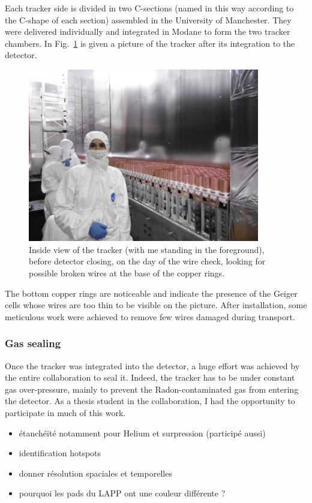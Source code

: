 Each tracker side is divided in two C-sections (named in this way according to the C-shape of each section) assembled in the University of Manchester.
They were delivered individually and integrated in Modane to form the two tracker chambers.
In Fig.~\ref{fig:me_tracker} is given a picture of the tracker after its integration to the detector.
\begin{figure}[h!]
\centering
\includegraphics[width=0.9\textwidth]{SNdemonstrator/fig_SNdemonstrator/tracker_selfie.jpg}
\caption{Inside view of the tracker (with me standing in the foreground), before detector closing, on the day of the wire check, looking for possible broken wires at the base of the copper rings.
\label{fig:me_tracker}}
\end{figure}
The bottom copper rings are noticeable and indicate the presence of the Geiger cells whose wires are too thin to be visible on the picture.
After installation, some meticulous work were achieved to remove few wires damaged during transport.

\subsubsection*{Gas sealing}

Once the tracker was integrated into the detector, a huge effort was achieved by the entire collaboration to seal it.
Indeed, the tracker has to be under constant gas over-pressure, mainly to prevent the Radon-contaminated gas from entering the detector.
As a thesis student in the collaboration, I had the opportunity to participate in much of this work.

\begin{itemize}
\item étanchéïté notamment pour Helium et surpression (participé aussi)
\item identification hotspots
\item donner résolution spaciales et temporelles
\item pourquoi les pads du LAPP ont une couleur différente ?
\end{itemize}

